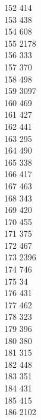 { 152	414 \\
 153	438 \\
 154	608 \\
 155	2178 \\
 156	333 \\
 157	370 \\
 158	498 \\
 159	3097 \\
 160	469 \\
 161	427 \\
 162	441 \\
 163	295 \\
 164	490 \\
 165	338 \\
 166	417 \\
 167	463 \\
 168	343 \\
 169	420 \\
 170	455 \\
 171	375 \\
 172	467 \\
 173	2396 \\
 174	746 \\
 175	34 \\
 176	431 \\
 177	462 \\
 178	323 \\
 179	396 \\
 180	380 \\
 181	315 \\
 182	448 \\
 183	351 \\
 184	431 \\
 185	415 \\
 186	2102 \\
}
